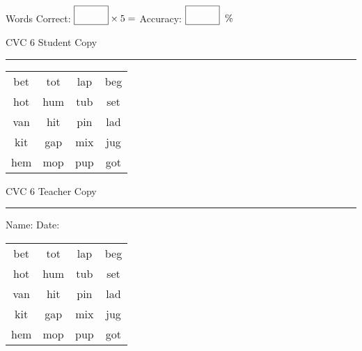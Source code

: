 \documentclass{memoir}
\begin{document}
\small

Words Correct: $\fbox{\phantom{\huge 100}} \times 5 = $ Accuracy: $\fbox{\phantom{\huge 100}}\;\; \%$ 

\vfill

\newpage


\footnotesize \noindent
CVC 6 \hfill Student Copy
\smallskip
\hrule

\Large

\setlength{\tabcolsep}{14pt}
\def\arraystretch{2}

{\selectfont


\begin{vplace}[0.5]
\begin{center}
\begin{tabular}{cccc}
bet & tot & lap & beg \\
hot & hum & tub & set \\
van & hit & pin & lad \\
kit & gap & mix & jug \\
hem & mop & pup & got \\
\end{tabular}
\end{center}
\end{vplace}

}

\newpage

\footnotesize \noindent
CVC 6 \hfill Teacher Copy
\smallskip
\hrule

\small

\vfill

\noindent
Name: \underline{\hspace{1.75in}} \hfill Date: \underline{\hspace{1in}}

\Large

{\selectfont


\begin{vplace}[0.5]
\begin{center}
\begin{tabular}{cccc}
bet & tot & lap & beg \\
hot & hum & tub & set \\
van & hit & pin & lad \\
kit & gap & mix & jug \\
hem & mop & pup & got \\
\end{tabular}
\end{center}
\end{vplace}



}
\end{document}
